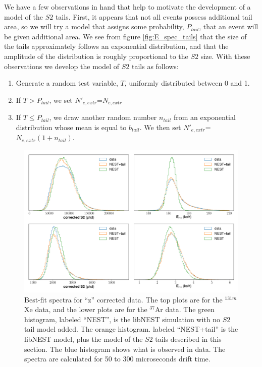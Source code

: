 {We have a few observations in hand that help to motivate the development of a model of the $S2$ tails. First, it appears that not all events possess additional tail area, so we will try a model that assigns some probability, $P_{tail}$, that an event will be given additional area. We see from figure \ref{fig:E_spec_tails} that the size of the tails approximately follows an exponential distribution, and that the amplitude of the distribution is roughly proportional to the $S2$ size. With these observations we develop the model of $S2$ tails as follows:
\begin{enumerate}
\item Generate a random test variable, $T$, uniformly distributed between 0 and 1.
\item If $T>P_{tail}$, we set $N'_{e,extr}$=$N_{e,extr}$
\item If $T\leq P_{tail}$, we draw another random number $n_{tail}$ from an exponential distribution whose mean is equal to $b_{tail}$. We then set $N'_{e,extr}$=$N_{e,extr}(1+n_{tail})$.
\end{enumerate}
\begin{figure}[h!]
  \centering
  \includegraphics[width=\textwidth]{Figures/S2tail_hists_z.pdf}
\caption{Best-fit spectra for ``z'' corrected data. The top plots are for the $^{131m}$Xe data, and the lower plots are for the $^{37}$Ar data. The green histogram, labeled ``NEST'', is the libNEST simulation with no $S2$ tail model added. The orange histogram. labeled ``NEST+tail'' is the libNEST model, plus the model of the $S2$ tails described in this section. The blue histogram shows what is observed in data. The spectra are calculated for 50 to 300 microseconds drift time.  }
\label{fig:s2bestfit_spec_z}
\end{figure}

}
